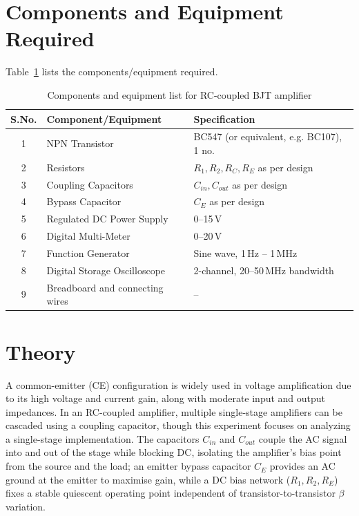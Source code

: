 \section{Components and Equipment Required}
Table~\ref{tab:CompsBJTAmp} lists the components/equipment required.
\begin{table}[htbp!]
	\centering
	\begin{tabular}{@{}cll@{}}
		\toprule
		S.No. & Component/Equipment & Specification \\
		\midrule
		1  & NPN Transistor & BC547 (or equivalent, e.g. BC107), 1 no. \\
		2  & Resistors & $R_1, R_2, R_C, R_E$ as per design \\
		3  & Coupling Capacitors & $C_{in}, C_{out}$ as per design \\
		4  & Bypass Capacitor & $C_E$ as per design \\
		5  & Regulated DC Power Supply & 0--15\,V \\
		6  & Digital Multi-Meter & 0--20\,V\\
		7  & Function Generator & Sine wave, 1\,Hz -- 1\,MHz \\
		8  & Digital Storage Oscilloscope & 2-channel, 20--50\,MHz bandwidth \\
		9  & Breadboard and connecting wires & -- \\
		\bottomrule
	\end{tabular}
	\caption{Components and equipment list for RC-coupled BJT amplifier}
	\label{tab:CompsBJTAmp}
\end{table}
\section{Theory}
A common-emitter (CE) configuration is widely used in voltage amplification due to its high voltage and current gain, along with moderate input and output impedances. In an RC-coupled amplifier, multiple single-stage amplifiers can be cascaded using a coupling capacitor, though this experiment focuses on analyzing a single-stage implementation. The capacitors $C_{in}$ and $C_{out}$ couple the AC signal into and out of the stage while blocking DC, isolating the amplifier's bias point from the source and the load; an emitter bypass capacitor $C_E$ provides an AC ground at the emitter to maximise gain, while a DC bias network ($R_1, R_2, R_E$) fixes a stable quiescent operating point independent of transistor-to-transistor $\beta$ variation.


